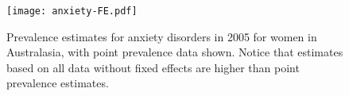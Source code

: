     \begin{figure}[h]
        \begin{center}
            \texttt{[image: anxiety-FE.pdf]}
            \caption{Prevalence estimates for anxiety disorders in 2005 for women in Australasia, with point prevalence data shown.  Notice that estimates based on all data without fixed effects are higher than point prevalence estimates.}
            \label{fig:app-anxiety FE}
        \end{center}
    \end{figure}

